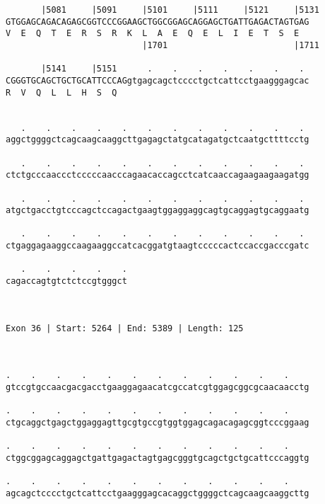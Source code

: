 \documentclass{article}
\begin{document}
\begin{Verbatim}
       |5081     |5091     |5101     |5111     |5121     |5131
GTGGAGCAGACAGAGCGGTCCCGGAAGCTGGCGGAGCAGGAGCTGATTGAGACTAGTGAG
V  E  Q  T  E  R  S  R  K  L  A  E  Q  E  L  I  E  T  S  E  
                           |1701                         |1711
  
       |5141     |5151      .    .    .    .    .    .    . 
CGGGTGCAGCTGCTGCATTCCCAGgtgagcagctcccctgctcattcctgaagggagcac
R  V  Q  L  L  H  S  Q                                      
                                                            
  
   .    .    .    .    .    .    .    .    .    .    .    . 
aggctggggctcagcaagcaaggcttgagagctatgcatagatgctcaatgcttttcctg
                                                            
   .    .    .    .    .    .    .    .    .    .    .    . 
ctctgcccaaccctcccccaacccagaacaccagcctcatcaaccagaagaagaagatgg
                                                            
   .    .    .    .    .    .    .    .    .    .    .    . 
atgctgacctgtcccagctccagactgaagtggaggaggcagtgcaggagtgcaggaatg
                                                            
   .    .    .    .    .    .    .    .    .    .    .    . 
ctgaggagaaggccaagaaggccatcacggatgtaagtcccccactccaccgacccgatc
                                                            
   .    .    .    .    .
cagaccagtgtctctccgtgggct
                        
                        
 
Exon 36 | Start: 5264 | End: 5389 | Length: 125



.    .    .    .    .    .    .    .    .    .    .    .    
gtccgtgccaacgacgacctgaaggagaacatcgccatcgtggagcggcgcaacaacctg
                                                            
.    .    .    .    .    .    .    .    .    .    .    .    
ctgcaggctgagctggaggagttgcgtgccgtggtggagcagacagagcggtcccggaag
                                                            
.    .    .    .    .    .    .    .    .    .    .    .    
ctggcggagcaggagctgattgagactagtgagcgggtgcagctgctgcattcccaggtg
                                                            
.    .    .    .    .    .    .    .    .    .    .    .    
agcagctcccctgctcattcctgaagggagcacaggctggggctcagcaagcaaggcttg
                                                            

\end{Verbatim}
\end{document}
